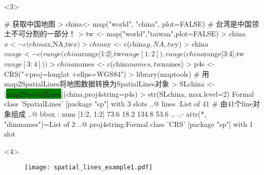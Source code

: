 \begin{frame}[t,fragile]{\subsecname}{\subsubsecname}
\begin{overlayarea}{\textwidth}{\textheight}
\begin{onlyenv}<3>
\begin{rcode}
# 获取中国地图
> china<- map("world", "china", plot=FALSE)
# 台湾是中国领土不可分割的一部分！
> tw <- map("world","taiwan",plot=FALSE)
> china$x <- c(china$x,NA,tw$x)
> china$y <- c(china$y,NA,tw$y)
> china$range <- c(range(china$range[1:2],tw$range[1:2]),range(china$range[3:4],tw$range[3:4]))
> china$names <- c(china$names,tw$names)
> p4s <- CRS("+proj=longlat +ellps=WGS84")
> library(maptools)
# 用map2SpatialLines将地图数据转换为SpatialLines对象
> SLchina <- |\colorbox{green}{map2SpatialLines}|(china,proj4string=p4s)
> str(SLchina, max.level=2)
Formal class 'SpatialLines' [package "sp"] with 3 slots
  ..@ lines      :List of 41  # 由41个line对象组成
  ..@ bbox       : num [1:2, 1:2] 73.6 18.2 134.8 53.6
  .. ..- attr(*, "dimnames")=List of 2
  ..@ proj4string:Formal class 'CRS' [package "sp"] with 1 slot
\end{rcode}
\end{onlyenv}

\begin{onlyenv}<4>
\begin{figure}[ht] \vspace{-15pt}
  \texttt{[image: spatial\_lines\_example1.pdf]}
\end{figure}
\end{onlyenv}
\end{overlayarea}
\end{frame}

